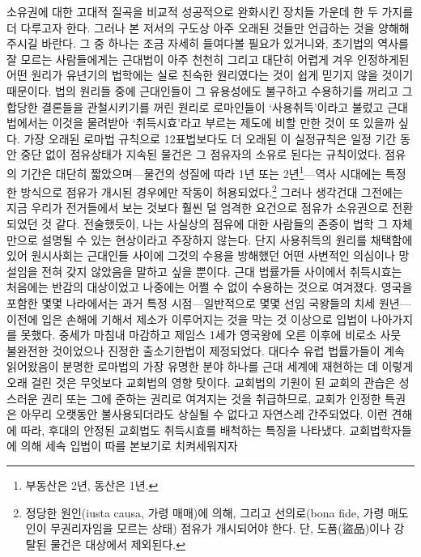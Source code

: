 소유권에 대한 고대적 질곡을 비교적 성공적으로 완화시킨 장치들 가운데
한 두 가지를 더 다루고자 한다.
그러나 본 저서의 구도상 아주 오래된 것들만 언급하는 것을
양해해 주시길 바란다.
그 중 하나는 조금 자세히 들여다볼 필요가 있거니와,
초기법의 역사를 잘 모르는 사람들에게는
근대법이 아주 천천히 그리고 대단히 어렵게 겨우 인정하게된
어떤 원리가 유년기의 법학에는 실로 친숙한 원리였다는 것이
쉽게 믿기지 않을 것이기 때문이다.
법의 원리들 중에
근대인들이 그 유용성에도 불구하고
수용하기를 꺼리고 그 합당한 결론들을 관철시키기를 꺼린
원리로
로마인들이 `\hypertarget{usucapio}{사용취득}'이라고
불렀고
근대법에서는
이것을 물려받아
`취득시효'라고 부르는 제도에
비할 만한 것이 또 있을까 싶다.
가장 오래된 로마법 규칙으로
12표법보다도 더 오래된
이 실정규칙은
일정 기간 동안 중단 없이 점유상태가 지속된 물건은
그 점유자의 소유로 된다는 규칙이었다.
점유의 기간은 대단히 짧았으며---물건의 성질에 따라
1년 또는 2년\footnote{%
  부동산은 2년, 동산은 1년.
}---역사
시대에는 특정한 방식으로 점유가 개시된 경우에만 작동이 허용되었다.\footnote{%
  정당한 원인(iusta causa, 가령 매매)에 의해, 그리고
  선의로(bona fide, 가령 매도인이 무권리자임을 모르는 상태)
  점유가 개시되어야 한다.
  단, 도품(盜品)이나 강탈된 물건은 대상에서 제외된다. }
그러나 생각건대 그전에는
지금 우리가 전거들에서 보는 것보다 훨씬 덜 엄격한 요건으로
점유가 소유권으로 전환되었던 것 같다.
전술했듯이,
나는 사실상의 점유에 대한 사람들의 존중이
법학 그 자체만으로 설명될 수 있는 현상이라고 주장하지 않는다.
단지 사용취득의 원리를 채택함에 있어 원시사회는
근대인들 사이에 그것의 수용을 방해했던
어떤 사변적인 의심이나 망설임을 전혀 갖지 않았음을 말하고 싶을 뿐이다.
근대 법률가들 사이에서 취득시효는
처음에는 반감의 대상이었고
나중에는 어쩔 수 없이 수용하는 것으로 여겨졌다.
영국을 포함한 몇몇 나라에서는
과거 특정 시점---일반적으로 몇몇 선임 국왕들의 치세 원년---이전에 입은
손해에 기해서 제소가
이루어지는 것을 막는 것 이상으로
입법이 나아가지를 못했다.
중세가 마침내 마감하고
제임스 1세가 영국왕에 오른 이후에
비로소
사뭇 불완전한 것이었으나 진정한
출소기한법이
제정되었다.
대다수 유럽 법률가들이 계속 읽어왔음이 분명한
로마법의 가장 유명한 분야 하나를 근대 세계에 재현하는 데
이렇게 오래 걸린 것은
무엇보다 교회법의 영향 탓이다.
교회법의 기원이 된 교회의 관습은
성스러운 권리 또는 그에 준하는 권리로 여겨지는 것을 취급하므로,
교회가 인정한 특권은
아무리 오랫동안 불사용되더라도
상실될 수 없다고
자연스레
간주되었다.
이런 견해에 따라,
후대의 안정된 교회법도 취득시효를 배척하는 특징을 나타냈다.
교회법학자들에 의해 세속 입법이 따를 본보기로 치켜세워지자
